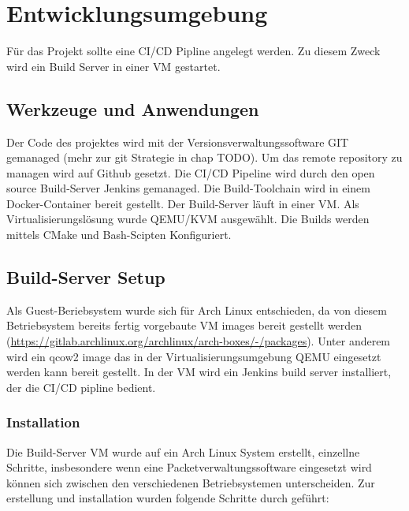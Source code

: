 \chapter{Entwicklungsumgebung}

Für das Projekt sollte eine \acf{CI/CD} Pipline angelegt werden. Zu diesem Zweck wird ein Build Server in einer \acf{VM} gestartet.

\section{Werkzeuge und Anwendungen}

Der Code des projektes wird mit der Versionsverwaltungssoftware GIT gemanaged (mehr zur git Strategie in chap TODO). Um das remote repository zu managen wird auf Github gesetzt. Die \ac{CI/CD} Pipeline wird durch den open source Build-Server Jenkins gemanaged. Die Build-Toolchain wird in einem Docker-Container bereit gestellt. Der Build-Server läuft in einer \ac{VM}. Als Virtualisierungslösung wurde QEMU/KVM ausgewählt. Die Builds werden mittels CMake und Bash-Scipten Konfiguriert.

\section{Build-Server Setup}

Als Guest-Beriebsystem wurde sich für Arch Linux entschieden, da von diesem Betriebsystem bereits fertig vorgebaute \ac{VM} images bereit gestellt werden (\url{https://gitlab.archlinux.org/archlinux/arch-boxes/-/packages}). Unter anderem wird ein qcow2 image das in der Virtualisierungsumgebung QEMU eingesetzt werden kann bereit gestellt.
In der \ac{VM} wird ein Jenkins build server installiert, der die CI/CD pipline bedient.

\subsection{Installation}

Die Build-Server \ac{VM} wurde auf ein Arch Linux System erstellt, einzellne Schritte, insbesondere wenn eine Packetverwaltungssoftware eingesetzt wird können sich zwischen den verschiedenen Betriebsystemen unterscheiden.
Zur erstellung und installation wurden folgende Schritte durch geführt:

